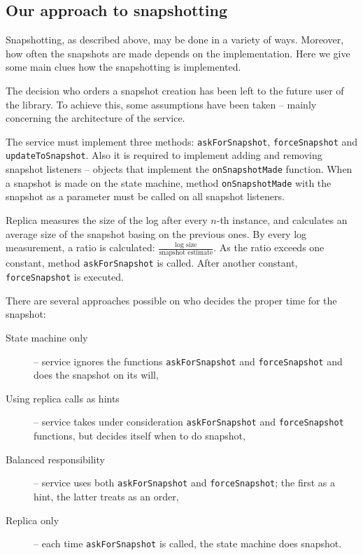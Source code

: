 \subsection{Our approach to snapshotting}
\label{subsec:our_approach_to_snapshotting}
Snapshotting, as described above, may be done in a variety of ways. Moreover, how often the snapshots are made depends on the implementation. Here we give some main clues how the snapshotting is implemented.

The decision who orders a snapshot creation has been left to the future user of the library. To achieve this, some assumptions have been taken -- mainly concerning the architecture of the service.

The service must implement three methods: \texttt{askForSnapshot}, \texttt{forceSnapshot} and \texttt{up\-date\-To\-Snap\-shot}. Also it is required to implement adding and removing snapshot listeners -- objects that implement the \texttt{onSnapshotMade} function. When a snapshot is made on the state machine, method \texttt{onSnapshotMade} with the snapshot as a parameter must be called on all snapshot listeners.

Replica measures the size of the log after every $n$-th instance, and calculates an average size of the snapshot basing on the previous ones. By every log measurement, a ratio is calculated: $\frac{ \text{log size} }{ \text{snapshot estimate} }$. As the ratio exceeds one constant, method \texttt{askForSnapshot} is called. After another constant, \texttt{forceSnapshot} is executed.

There are several approaches possible on who decides the proper time for the snapshot:
\begin{description} 
 \item[State machine only] -- service ignores the functions \texttt{askForSnapshot} and \texttt{forceSnap\-shot} and does the snapshot on its will,
 \item[Using replica calls as hints] -- service takes under consideration \texttt{askForSnapshot} and \texttt{fo\-rce\-Snapshot} functions, but decides itself when to do snapshot,
 \item[Balanced responsibility] -- service uses both \texttt{askForSnapshot} and \texttt{forceSnapshot}; the first as a hint, the latter treats as an order,
 \item[Replica only] -- each time \texttt{askForSnapshot} is called, the state machine does snapshot.
\end{description}

